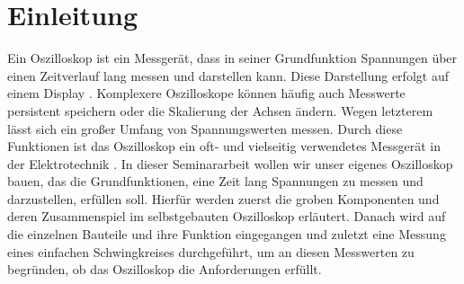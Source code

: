\section{Einleitung}

Ein Oszilloskop ist ein Messgerät, dass in seiner Grundfunktion Spannungen
über einen Zeitverlauf lang messen und darstellen kann. \newline
Diese Darstellung erfolgt auf einem Display \cite{KnowUrOscilloscope}. \newline
Komplexere Oszilloskope können häufig auch Messwerte persistent speichern oder die Skalierung der Achsen
ändern. Wegen letzterem lässt sich ein großer Umfang von Spannungswerten messen.
Durch diese Funktionen ist das Oszilloskop ein oft- und vielseitig verwendetes Messgerät
in der Elektrotechnik \cite{ETechnikEinfach}. \newline \newline
In dieser Seminararbeit wollen wir unser eigenes Oszilloskop bauen, das die Grundfunktionen,
eine Zeit lang Spannungen  zu messen und darzustellen, erfüllen soll.
Hierfür werden zuerst die groben Komponenten und deren Zusammenspiel im selbstgebauten Oszilloskop erläutert.\newline
Danach wird auf die einzelnen Bauteile und ihre Funktion eingegangen und
zuletzt eine Messung eines einfachen Schwingkreises durchgeführt, um an diesen Messwerten zu begründen,
ob das Oszilloskop die Anforderungen erfüllt.  

